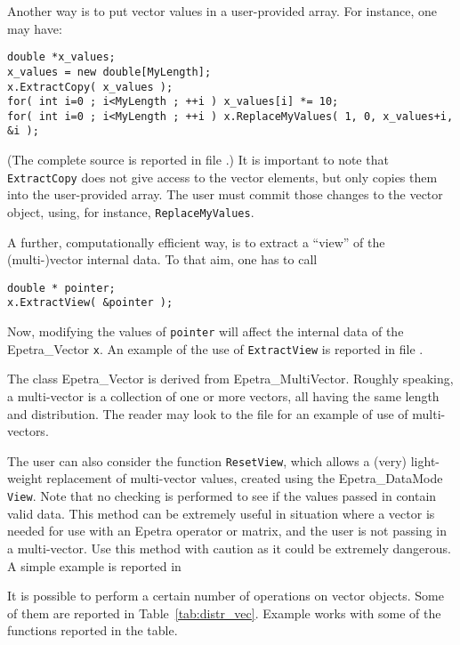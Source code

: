 Another way is to put vector values in a user-provided array. For
instance, one may have:
\begin{verbatim}
double *x_values;
x_values = new double[MyLength];
x.ExtractCopy( x_values );
for( int i=0 ; i<MyLength ; ++i ) x_values[i] *= 10;
for( int i=0 ; i<MyLength ; ++i ) x.ReplaceMyValues( 1, 0, x_values+i, &i );
\end{verbatim}
(The complete source is reported in file .)  It
is important to note that \verb!ExtractCopy! does not give access to the
vector elements, but only copies them into the user-provided array.  The
user must commit those changes to the vector object, using, for
instance, \verb!ReplaceMyValues!.

A further, computationally efficient way, is to extract a ``view'' of the
(multi-)vector internal data.  To that aim, one has to call
\begin{verbatim}
double * pointer;
x.ExtractView( &pointer );
\end{verbatim}
Now, modifying the values of \verb!pointer! will affect the internal
data of the Epetra\_Vector \verb!x!.  An example of the use of
\verb!ExtractView! is reported in file .

\begin{remark}
  The class Epetra\_Vector is derived from Epetra\_MultiVector. Roughly
  speaking, a multi-vector is a collection of one or more vectors, all
  having the same length and distribution. The reader may look to the
  file  for an example of use of multi-vectors.
\end{remark}

The user can also consider the function \verb!ResetView!, which allows a
(very) light-weight replacement of multi-vector values, created using
the Epetra\_DataMode \verb!View!. Note that no checking is performed to
see if the values passed in contain valid data. This method can be
extremely useful in situation where a vector is needed for use with an
Epetra operator or matrix, and the user is not passing in a
multi-vector. Use this method with caution as it could be extremely
dangerous.
A simple example is reported in 

\medskip

It is possible to perform a certain number of operations on vector
objects. Some of them are reported in Table~\ref{tab:distr_vec}.
Example  works with some of the functions reported in
the table.

